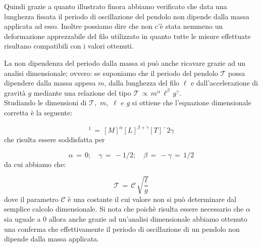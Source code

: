Quindi grazie a quanto illustrato finora abbiamo verificato che data una lunghezza fissata il periodo di oscillazione del pendolo non dipende dalla massa applicata ad esso. Inoltre possiamo dire che non c'è stata nemmeno un deformazione apprezzabile del filo utilizzato in quanto tutte le misure effettuate risultano compatibili con i valori ottenuti.

La non dipendenza del periodo dalla massa si può anche ricavare grazie ad un analisi dimensionale; ovvero: se suponiamo che il periodo del pendolo $\mathcal{T}$ possa dipendere dalla massa appesa $m$, dalla lunghezza del filo $\ell$ e dall'accelerazione di gravità $g$ mediante una relazione del tipo $\mathcal{T} \,\propto\, m^\alpha \, \ell^\beta \, g^\gamma$.\\
Studiando le dimensioni di $\mathcal{T}, \,\, m, \,\, \ell \,\,e\,\, g$ si ottiene che l'equazione dimensionale corretta è la seguente:

\begin{equation*}
	[T]^1 \,=\, [M]^\alpha[L]^{\beta+\gamma}[T]^-2\gamma 
\end{equation*}
%
che risulta essere soddisfatta per

\begin{equation*}
	\alpha \,=\, 0; \quad \gamma \,=\, -1/2; \quad \beta \,=\, -\gamma \,=\, 1/2 
\end{equation*}
%
da cui abbiamo che:

\begin{equation*}
	\mathcal{T} \,=\, \mathcal{C} \, \sqrt{\frac{\ell}{g}}
\end{equation*}
%
dove il parametro $\mathcal{C}$ è una costante il cui valore non si può determinare dal semplice calcolo dimensionale. Si nota che poichè risulta essere necessario che $\alpha$ sia uguale a 0 allora anche grazie ad un'analisi dimensionale abbiamo ottenuto una conferma che effettivamente il periodo di oscillazione di un pendolo non dipende dalla massa applicata.

